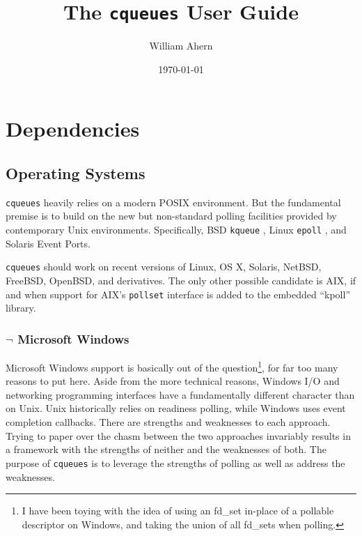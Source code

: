 \documentclass[11pt, oneside]{memoir}
\newcommand{\cqueues}[0]{\texttt{cqueues} }
\newcommand{\syscall}[1]{\texttt{#1} }
\begin{document}

\title{
\HUGE\sffamily The \cqueues User Guide
}

\date{\today}
\author{William Ahern}
\maketitle
\thispagestyle{empty}
\clearpage

\setcounter{page}{1}
\tableofcontents

\clearpage

\setcounter{page}{1}


\chapter{Dependencies}

\section{Operating Systems}

\cqueues heavily relies on a modern POSIX environment. But the fundamental premise is to build on the new but non-standard polling facilities provided by contemporary Unix environments. Specifically, BSD \syscall{kqueue}, Linux \syscall{epoll}, and Solaris Event Ports.

\cqueues should work on recent versions of Linux, OS X, Solaris, NetBSD, FreeBSD, OpenBSD, and derivatives. The only other possible candidate is AIX, if and when support for AIX's \syscall{pollset} interface is added to the embedded ``kpoll'' library.

\subsection{$\lnot$ Microsoft Windows}

Microsoft Windows support is basically out of the question\footnote{I have been toying with the idea of using an fd\_set in-place of a pollable descriptor on Windows, and taking the union of all fd\_sets when polling.}, for far too many reasons to put here. Aside from the more technical reasons, Windows I/O and networking programming interfaces have a fundamentally different character than on Unix. Unix historically relies on readiness polling, while Windows uses event completion callbacks. There are strengths and weaknesses to each approach. Trying to paper over the chasm between the two approaches invariably results in a framework with the strengths of neither and the weaknesses of both. The purpose of \cqueues is to leverage the strengths of polling as well as address the weaknesses.
\end{document}

